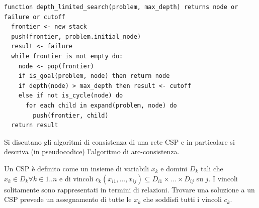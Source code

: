 \documentclass[answers, a4paper, 11pt]{exam}
\begin{document}
\begin{questions}
\begin{solution}
\begin{verbatim}
function depth_limited_search(problem, max_depth) returns node or failure or cutoff
  frontier <- new stack
  push(frontier, problem.initial_node)
  result <- failure
  while frontier is not empty do:
    node <- pop(frontier)
    if is_goal(problem, node) then return node
    if depth(node) > max_depth then result <- cutoff
    else if not is_cycle(node) do
      for each child in expand(problem, node) do
        push(frontier, child)
  return result
\end{verbatim}
	\end{solution}
\question Si discutano gli algoritmi di consistenza di una rete CSP e in particolare si descriva (in pseudocodice) l’algoritmo di arc-consistenza.
  \begin{solution}
    Un CSP è definito come un insieme di variabili $x_k$ e domini $D_k$ tali che $x_k \in D_k \forall k \in 1..n$ e di vincoli $c_k(x_{i1}, ..., x_{ij}) \subseteq D_{i1} \times ... \times D_{ij}$ su $j$. 
    I vincoli solitamente sono rappresentati in termini di relazioni. 
    Trovare una soluzione a un CSP prevede un assegnamento di tutte le $x_k$ che soddisfi tutti i vincoli $c_k$. 


\end{solution}
\end{questions}
\end{document}
